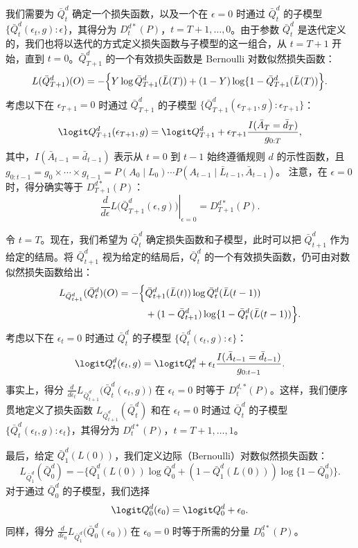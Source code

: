 我们需要为 $\bar Q_t^d$ 确定一个损失函数，以及一个在 $\epsilon=0$ 时通过 $\bar Q_t^d$ 的子模型 $\{\bar Q_t^d(\epsilon_t,g):\epsilon\}$，其得分为 $D_t^{d*}(P)$，$t=T+1,\ldots,0$。由于参数 $\bar Q_t^d$ 是迭代定义的，我们也将以迭代的方式定义损失函数与子模型的这一组合，从 $t=T+1$ 开始，直到 $t=0$。$\bar Q_{T+1}^d$ 的一个有效损失函数是 Bernoulli 对数似然损失函数：
\[
 L(\bar Q_{T+1}^d)(O)
 =-\Bigl\{Y\log\bar Q_{T+1}^d(\bar L(T))
 +(1-Y)\log\{1-\bar Q_{T+1}^d(\bar L(T))\Bigr\}.
\]
考虑以下在 $\epsilon_{T+1}=0$ 时通过 $\bar Q_{T+1}^d$ 的子模型
$\{\bar Q_{T+1}^d(\epsilon_{T+1},g):\epsilon_{T+1}\}$：
\[
 \logit Q_{T+1}^d(\epsilon_{T+1},g)
 =\logit Q_{T+1}^d
 +\epsilon_{T+1}\frac{I(\bar A_T=\bar d_T)}{g_{0:T}},
\]
其中，$I(\bar A_{t-1}=\bar d_{t-1})$ 表示从 $t=0$ 到 $t-1$ 始终遵循规则 $d$ 的示性函数，且
$g_{0:t-1}=g_0\times\cdots\times g_{t-1}
=P(A_0\mid L_0)\cdots P(A_{t-1}\mid\bar L_{t-1},\bar A_{t-1})$。
注意，在 $\epsilon=0$ 时，得分确实等于 $D_{T+1}^{d*}(P)$：
\[
 \left.\frac{d}{d\epsilon}L\bigl(\bar Q_{T+1}^d(\epsilon,g)\bigr)
 \right|_{\epsilon=0}=D_{T+1}^{d*}(P).
\]

令 $t=T$。现在，我们希望为 $\bar Q_t^d$ 确定损失函数和子模型，此时可以把 $\bar Q_{t+1}^d$ 作为给定的结局。将 $\bar Q_{t+1}^d$ 视为给定的结局后，$\bar Q_t^d$ 的一个有效损失函数，仍可由对数似然损失函数给出：
\[
 \begin{aligned}
 L_{\bar Q_{t+1}^d}(\bar Q_t^d)(O)
 =-\Bigl\{&
 \bar Q_{t+1}^d(\bar L(t))\log\bar Q_t^d(\bar L(t-1))\\
 &{}+(1-\bar Q_{t+1}^d)\log\{1-\bar Q_t^d(\bar L(t-1))\Bigr\}.
 \end{aligned}
\]
考虑以下在 $\epsilon_t=0$ 时通过 $\bar Q_t^d$ 的子模型
$\{\bar Q_t^d(\epsilon_t,g):\epsilon\}$：
\[
 \logit Q_t^d(\epsilon_t,g)
 =\logit Q_t^d+\epsilon_t\frac{I(\bar A_{t-1}=\bar d_{t-1})}{g_{0:t-1}}.
\]
事实上，得分
$\frac{d}{d\epsilon_t}L_{\bar Q_{t+1}^d}\bigl(\bar Q_t^d(\epsilon_t,g)\bigr)$
在 $\epsilon_t=0$ 时等于 $D_t^{d,*}(P)$。这样，我们便序贯地定义了损失函数 $L_{\bar Q_{t+1}^d}(\bar Q_t^d)$ 和在 $\epsilon_t=0$ 时通过 $\bar Q_t^d$ 的子模型
$\{\bar Q_t^d(\epsilon_t,g):\epsilon_t\}$，其得分为 $D_t^{d*}(P)$，$t=T+1,\ldots,1$。

最后，给定 $\bar Q_1^d(L(0))$，我们定义边际（Bernoulli）对数似然损失函数：
\[
 L_{\bar Q_1^d}(\bar Q_0^d)
 =-\bigl\{\bar Q_1^d(L(0))\log\bar Q_0^d
 +(1-\bar Q_1^d(L(0)))\log\{1-\bar Q_0^d)\bigr\}.
\]
对于通过 $\bar Q_0^d$ 的子模型，我们选择
\[
 \logit Q_0^d(\epsilon_0)=\logit Q_0^d+\epsilon_0.
\]
同样，得分
$\frac{d}{d\epsilon_0}L_{\bar Q_1^d}\bigl(\bar Q_0^d(\epsilon_0)\bigr)$
在 $\epsilon_0=0$ 时等于所需的分量 $D_0^{d*}(P)$。

